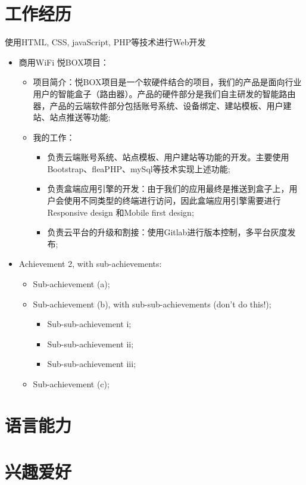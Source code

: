 \documentclass[11pt,a4paper,sans]{moderncv}        %
\begin{document}
\section{工作经历}
{使用HTML, CSS, javaScript, PHP等技术进行Web开发
\newline{}%
\begin{itemize}%
\item 商用WiFi 悦BOX项目：
  \begin{itemize}%
  \item 项目简介：悦BOX项目是一个软硬件结合的项目，我们的产品是面向行业用户的智能盒子（路由器）。产品的硬件部分是我们自主研发的智能路由器，产品的云端软件部分包括账号系统、设备绑定、建站模板、用户建站、站点推送等功能;
  \item 我的工作：
      \begin{itemize}%
        \item 负责云端账号系统、站点模板、用户建站等功能的开发。主要使用Bootstrap、fleaPHP、mySql等技术实现上述功能;
        \item 负责盒端应用引擎的开发：由于我们的应用最终是推送到盒子上，用户会使用不同类型的终端进行访问，因此盒端应用引擎需要进行Responsive design 和Mobile first design;
        \item 负责云平台的升级和割接：使用Gitlab进行版本控制，多平台灰度发布;
      \end{itemize}
  \end{itemize}
\item Achievement 2, with sub-achievements:
  \begin{itemize}%
  \item Sub-achievement (a);
  \item Sub-achievement (b), with sub-sub-achievements (don't do this!);
    \begin{itemize}
    \item Sub-sub-achievement i;
    \item Sub-sub-achievement ii;
    \item Sub-sub-achievement iii;
    \end{itemize}
  \item Sub-achievement (c);
  \end{itemize}
\end{itemize}}

\section{语言能力}



\section{兴趣爱好}
\end{document}
